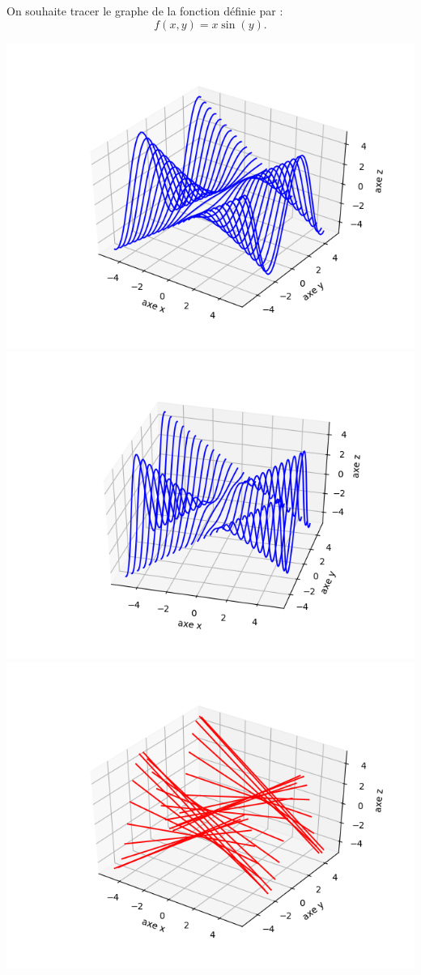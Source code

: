 \begin{exemple}{}{}
	On souhaite tracer le graphe de la fonction définie par :
	$$f(x,y) = x \sin(y).$$
	
	\begin{center}
		\includegraphics[scale=\myscale,scale=0.5]{figures/fonctions-surface-2a}
		\includegraphics[scale=\myscale,scale=0.5]{figures/fonctions-surface-2b}
		\includegraphics[scale=\myscale,scale=0.5]{figures/fonctions-surface-2c}

\end{center}
\end{exemple}
